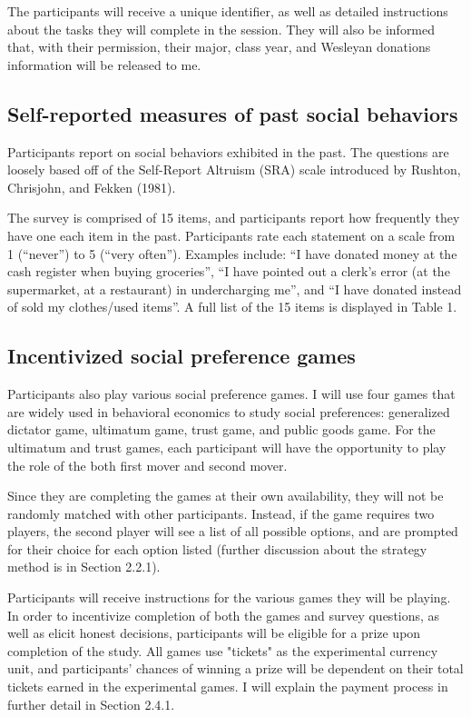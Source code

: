 \documentclass{article}
\begin{document}
The participants will receive a unique identifier, as well as detailed instructions about the tasks they will complete in the session. They will also be informed that, with their permission, their major, class year, and Wesleyan donations information will be released to me. 


\subsection{Self-reported measures of past social behaviors}

Participants report on social behaviors exhibited in the past. The questions are loosely based off of the Self-Report Altruism (SRA) scale introduced by Rushton, Chrisjohn, and Fekken (1981). 

The survey is comprised of 15 items, and participants report how frequently they have one each item in the past. Participants rate each statement on a scale from 1 (``never'') to 5 (``very often''). Examples include: ``I have donated money at the cash register when buying groceries'', ``I have pointed out a clerk\rq s error (at the supermarket, at a restaurant) in undercharging me'', and ``I have donated instead of sold my clothes/used items''. A full list of the 15 items is displayed in Table 1. 

\subsection{Incentivized social preference games}

Participants also play various social preference games. I will use four games that are widely used in behavioral economics to study social preferences: generalized dictator game, ultimatum game, trust game, and public goods game. For the ultimatum and trust games, each participant will have the opportunity to play the role of the both first mover and second mover.

Since they are completing the games at their own availability, they will not be randomly matched with other participants. Instead, if the game requires two players, the second player will see a list of all possible options, and are prompted for their choice for each option listed (further discussion about the strategy method is in Section 2.2.1). 

Participants will receive instructions for the various games they will be playing. In order to incentivize completion of both the games and survey questions, as well as elicit honest decisions, participants will be eligible for a prize upon completion of the study. All games use "tickets" as the experimental currency unit, and participants' chances of winning a prize will be dependent on their total tickets earned in the experimental games. I will explain the payment process in further detail in Section 2.4.1. 
\end{document}
